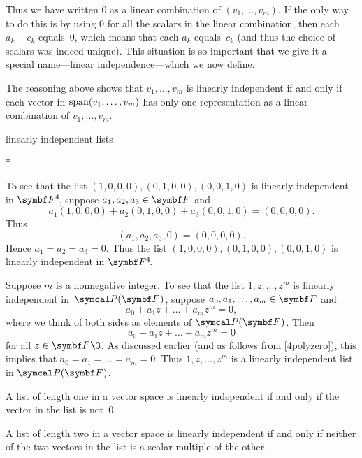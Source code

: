 \pagebreak[3]

\noindent
Thus we have written $0$ as a linear combination of $(v_1, \dots, v_m)$.  If the only way to do this is by using $0$ for
all the scalars in the linear combination, then each $a_k - c_k$ equals~$0$, which means that each $a_k$ equals~$c_k$ (and thus the choice of scalars was indeed
unique).  This situation is so important that we give it a special name---linear independence---which we now define.


The reasoning above shows that $v_1, \dots, v_m$ is linearly independent if and
only if each vector in $\operatorname{span} (v_1, \dots, v_m)$ has only one representation as a
linear combination of $v_1, \dots, v_m$.

\begin{example}{linearly independent lists}
\begin{subtheorem}*
\item
To see that the list $(1, 0, 0, 0), (0, 1, 0, 0), (0, 0, 1, 0)$ is linearly independent in $\FF{4}$, suppose $a_1, a_2, a_3 \in \F{}$ and
\[
a_1 (1, 0, 0, 0) + a_2(0, 1, 0, 0) + a_3(0,0,1, 0) = (0, 0, 0, 0).
\]
Thus
\[
(a_1, a_2, a_3, 0) = (0, 0, 0, 0).
\]
Hence $a_1 = a_2 = a_3 = 0$. Thus the list $(1, 0, 0, 0), (0, 1, 0, 0) ,(0,0,1, 0)$ is linearly independent in $\FF4$.

\item
Suppose $m$ is a nonnegative integer. To see that the list $1, z, \dots, z^m$ is linearly independent in\/~$\P(\F{})$, suppose $a_0, a_1, \dots, a_m \in \F{}$ and
\[
a_0 + a_1 z + \dots + a_m z^m = 0,
\]
where we think of both sides as elements of $\P(\F{})$. Then
\[
a_0 + a_1 z + \dots + a_m z^m = 0
\]
for all $z \in \F{}\3$. As discussed earlier (and as follows from \ref{4polyzero}), this implies that $a_0 = a_1 = \dots = a_m = 0$. Thus
$1, z, \dots, z^m$ is a linearly independent list in $\P(\F{})$.
\item
A list of length one in a vector space is linearly independent if and only if the vector in the list is not~$0$.
\item
A list of length two in a vector space is linearly independent if and only if neither of the two vectors in the list is a scalar multiple of the other.
\end{subtheorem}
\exampleitemend
\end{example}

